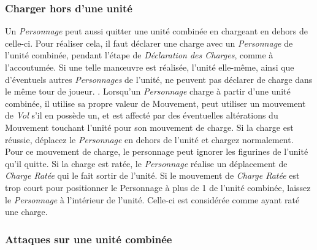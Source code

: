 \subsubsection*{Charger hors d'une unité}

Un \emph{Personnage} peut aussi quitter une unité combinée en chargeant en dehors de celle-ci. Pour réaliser cela, il faut déclarer une charge avec un \emph{Personnage} de l'unité combinée, pendant l'étape de \emph{Déclaration des Charges}, comme à l'accoutumée. Si une telle manœuvre est réalisée, l'unité elle-même, ainsi que d'éventuels autres \emph{Personnages} de l'unité, ne peuvent pas déclarer de charge dans le même tour de joueur. . Lorsqu'un \emph{Personnage} charge à partir d'une unité combinée, il utilise sa propre valeur de Mouvement, peut utiliser un mouvement de \emph{Vol} s'il en possède un, et est affecté par des éventuelles altérations du Mouvement touchant l'unité pour son mouvement de charge. Si la charge est réussie, déplacez le \emph{Personnage} en dehors de l'unité et chargez normalement. Pour ce mouvement de charge, le personnage peut ignorer les figurines de l'unité qu'il quitte. Si la charge est ratée, le \emph{Personnage} réalise un déplacement de \emph{Charge Ratée} qui le fait sortir de l'unité. Si le mouvement de \emph{Charge Ratée} est trop court pour positionner le Personnage à plus de \unit{1}{\pouce} de l'unité combinée, laissez le \emph{Personnage} à l'intérieur de l'unité. Celle-ci est considérée comme ayant raté une charge.

\subsubsection*{Attaques sur une unité combinée}

